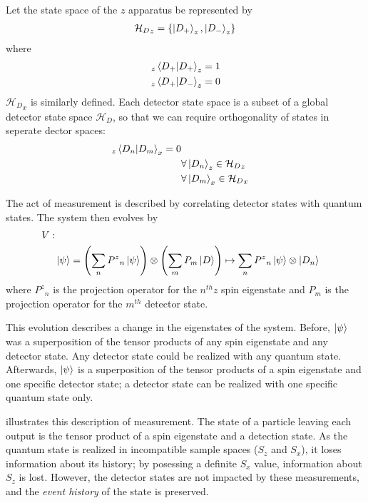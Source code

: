 Let the state space of the $z$ apparatus be represented by
\begin{align*}
    {\mathcal{H}_D}_z =  \{\ket{D_+}_z, \ket{D_-}_z\}
\end{align*}
where
\begin{align*}
    _z\braket{D_+|D_+}_z&=1 \\
    _z\braket{D_+|D_-}_z&=0
\end{align*}
${\mathcal{H}_D}_x$ is similarly defined. Each detector state space is a subset of a global detector state space $\mathcal{H}_D$, so that we can require orthogonality of states in seperate dector spaces:
\begin{align*}
    _z\braket{D_n|D_m}_x=0 \\
    & \forall \ket{D_n}_z \in {\mathcal{H}_D}_z \\
    & \forall \ket{D_m}_x \in {\mathcal{H}_D}_x
\end{align*}

The act of measurement is described by correlating detector states with quantum states. The system then evolves by
\begin{align}
    \nonumber V: \\
    & \ket{\psi} = \left(\sum_{n} {P^z}_n\ket{\psi}\right) \otimes \left(\sum_{m} P_m\ket{D}\right) \mapsto \sum_{n} {P^z}_n\ket{\psi} \otimes \ket{D_n}
\end{align}
where ${P^z}_n$ is the projection operator for the $n^{th} z$ spin eigenstate and $P_m$ is the projection operator for the $m^{th}$ detector state.

This evolution describes a change in the eigenstates of the system. Before, $\ket{\psi}$ was a superposition of the tensor products of any spin eigenstate and any detector state. Any detector state could be realized with any quantum state. Afterwards, $\ket{\psi}$ is a superposition of the tensor products of a spin eigenstate and one specific detector state; a detector state can be realized with one specific quantum state only.

 illustrates this description of measurement. The state of a particle leaving each output is the tensor product of a spin eigenstate and a detection state. As the quantum state is realized in incompatible sample spaces ($S_z$ and $S_x$), it loses information about its history; by posessing a definite $S_x$ value, information about $S_z$ is lost. However, the detector states are not impacted by these measurements, and the \textit{event history} of the state is preserved.

